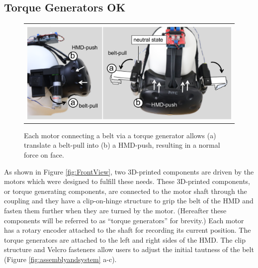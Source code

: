 \subsection{Torque Generators OK}

\begin{figure}[h]
\begin{center}
    \begin{tabular}{@{\hspace{0.1cm}}c}
        \includegraphics[width=1\linewidth]{figures/mechanical-design3}
    \end{tabular}
    \caption{Each motor connecting a belt via a torque generator allows (a) translate a belt-pull into (b) a HMD-push, resulting in a normal force on face.}
    \label{fig:mechanical_design}
 \end{center}
\end{figure}

As shown in Figure \ref{fig:FrontView}, two 3D-printed components are driven by the motors which were designed to fulfill these needs. These 3D-printed components, or torque generating components, are connected to the motor shaft through the coupling and they have a clip-on-hinge structure to grip the belt of the HMD and fasten them further when they are turned by the motor. (Hereafter these components will be referred to as ``torque generators'' for brevity.) Each motor has a rotary encoder attached to the shaft for recording its current position. The torque generators are attached to the left and right sides of the HMD. The clip structure and Velcro fasteners allow users to adjust the initial tautness of the belt (Figure \ref{fig:assemblyandsystem} a-c). 

